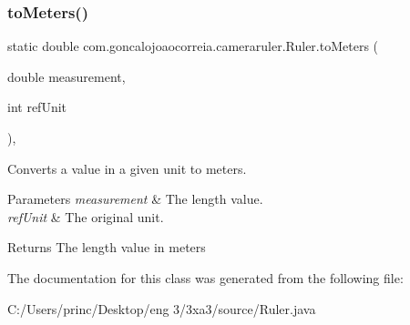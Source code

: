 \subsubsection{\texorpdfstring{to\+Meters()}{toMeters()}}
{\footnotesize\ttfamily static double com.\+goncalojoaocorreia.\+cameraruler.\+Ruler.\+to\+Meters (\begin{DoxyParamCaption}\item[{double}]{measurement,  }\item[{int}]{ref\+Unit }\end{DoxyParamCaption})\hspace{0.3cm}{\ttfamily [static]}, {\ttfamily [private]}}

Converts a value in a given unit to meters. 
\begin{DoxyParams}{Parameters}
{\em measurement} & The length value. \\
\hline
{\em ref\+Unit} & The original unit. \\
\hline
\end{DoxyParams}
\begin{DoxyReturn}{Returns}
The length value in meters 
\end{DoxyReturn}


The documentation for this class was generated from the following file\+:\begin{DoxyCompactItemize}
\item 
C\+:/\+Users/princ/\+Desktop/eng 3/3xa3/source/Ruler.\+java\end{DoxyCompactItemize}
